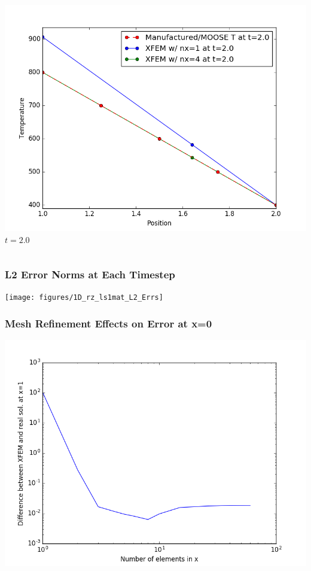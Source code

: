 \documentclass[]{beamer}
\begin{document}
\begin{frame}[t]
\begin{columns}
\begin{center}
			\includegraphics[scale=0.17]{figures/1D_rz_ls1mat_u_vs_x_20}\\
			$t=2.0$
			\end{center}
	\end{columns}
\end{frame}

\begin{frame}[t]\frametitle{L2 Error Norms at Each Timestep}
	\begin{center}
		\texttt{[image: figures/1D\_rz\_ls1mat\_L2\_Errs]}
	\end{center}
\end{frame}

\begin{frame}[t]\frametitle{Mesh Refinement Effects on Error at x=0}
	\begin{center}
		\includegraphics[scale=0.4]{figures/1D_rz_ls1mat_neumann_comp}
	\end{center}
\end{frame}
\end{document}
